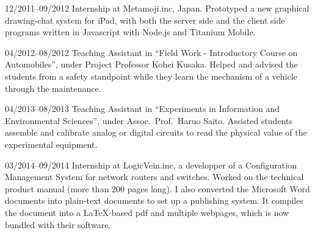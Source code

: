 \documentclass[a4paper]{article}
\begin{document}
\begin{CV}

\item[12/2011--09/2012] Internship at Metamoji.inc, Japan.
  Prototyped a new graphical drawing-chat system for
 iPad, with both the server side and the client side programs
 written in Javascript with Node.js and Titanium Mobile.

\item[04/2012--08/2012] Teaching Assistant in ``Field Work -
 Introductory Course on Automobiles'', under
 Project Professor Kohei Kusaka.
 Helped and advised the students from a safety standpoint while they
 learn the mechanism of a vehicle through the maintenance.
 
\item[04/2013--08/2013] Teaching Assistant in ``Experiments in
 Information and Environmental Sciences'', under
 Assoc.\ Prof.\ Haruo Saito.
 Assisted students assemble and calibrate analog or digital
 circuits to read the physical value of the
 experimental equipment.

\item[03/2014--09/2014] Internship at LogicVein.inc,
 a developper of a Configuration Management System
 for network routers and switches.
 Worked on %
 the technical product manual (more than 200 pages long). %
 I also converted the Microsoft Word documents into
 plain-text documents to set up a publishing system.  It compiles the
 document into a \LaTeX{}-based pdf and multiple webpages, which is now bundled
 with their software.
\end{CV}
\end{document}
